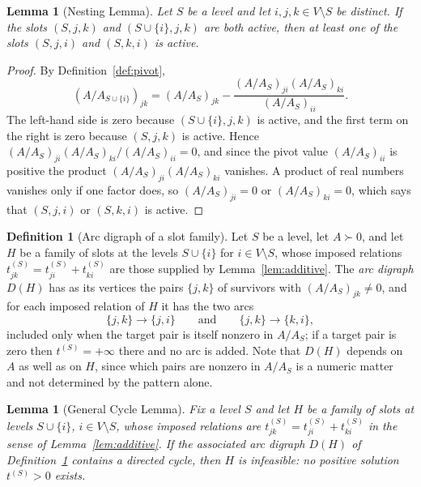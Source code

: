 \documentclass[11pt]{article}
\theoremstyle{plain}
\newtheorem{lemma}[theorem]{Lemma}
\theoremstyle{definition}
\newtheorem{definition}[theorem]{Definition}
\theoremstyle{remark}
\begin{document}
\begin{humanaiblock}
\begin{lemma}[Nesting Lemma]\label{lem:nesting}
Let $S$ be a level and let $i,j,k\in V\setminus S$ be distinct. If the slots $(S,j,k)$ and
$(S\cup\{i\},j,k)$ are both active, then at least one of the slots $(S,j,i)$ and $(S,k,i)$ is active.
\end{lemma}

\begin{proof}
By Definition~\ref{def:pivot},
\[
  (A/A_{S\cup\{i\}})_{jk}=(A/A_S)_{jk}-\frac{(A/A_S)_{ji}(A/A_S)_{ki}}{(A/A_S)_{ii}} .
\]
The left-hand side is zero because $(S\cup\{i\},j,k)$ is active, and the first term on the right is
zero because $(S,j,k)$ is active. Hence
$(A/A_S)_{ji}(A/A_S)_{ki}/(A/A_S)_{ii}=0$, and since the pivot value $(A/A_S)_{ii}$ is positive the
product $(A/A_S)_{ji}(A/A_S)_{ki}$ vanishes. A product of real numbers vanishes only if one factor
does, so $(A/A_S)_{ji}=0$ or $(A/A_S)_{ki}=0$, which says that $(S,j,i)$ or $(S,k,i)$ is active.
\end{proof}


\begin{definition}[Arc digraph of a slot family]\label{def:arcdigraph}
Let $S$ be a level, let $A\succ0$, and let $H$ be a family of slots at the levels $S\cup\{i\}$ for
$i\in V\setminus S$, whose imposed relations $t^{(S)}_{jk}=t^{(S)}_{ji}+t^{(S)}_{ki}$ are those
supplied by Lemma~\ref{lem:additive}. The \emph{arc digraph} $D(H)$ has as its vertices the pairs
$\{j,k\}$ of survivors with $(A/A_S)_{jk}\neq0$, and for each imposed relation of $H$ it has the two
arcs
\[
  \{j,k\}\to\{j,i\}\qquad\text{and}\qquad \{j,k\}\to\{k,i\},
\]
included only when the target pair is itself nonzero in $A/A_S$; if a target pair is zero then
$t^{(S)}=+\infty$ there and no arc is added. Note that $D(H)$ depends on $A$ as well as on $H$, since
which pairs are nonzero in $A/A_S$ is a numeric matter and not determined by the pattern alone.
\end{definition}


\begin{lemma}[General Cycle Lemma]\label{lem:cycle}
Fix a level $S$ and let $H$ be a family of slots at levels $S\cup\{i\}$, $i\in V\setminus S$, whose
imposed relations are $t^{(S)}_{jk}=t^{(S)}_{ji}+t^{(S)}_{ki}$ in the sense of
Lemma~\ref{lem:additive}. If the associated arc digraph $D(H)$ of Definition~\ref{def:arcdigraph}
contains a directed cycle, then $H$ is infeasible: no positive solution $t^{(S)}>0$ exists.
\end{lemma}



\end{humanaiblock}
\end{document}
